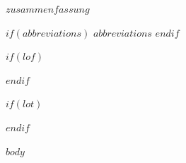 \documentclass[a4paper,12pt]{article}
\begin{document}
\newpage
$zusammenfassung$

$if(abbreviations)$
\newpage
$abbreviations$
$endif$

$if(lof)$
\newpage
\listoffigures
{}
$endif$

$if(lot)$
\newpage
\listoftables
{}
$endif$

\newpage
\pagestyle{plain}
\setcounter{page}{1}    				%

$body$

\end{document}
